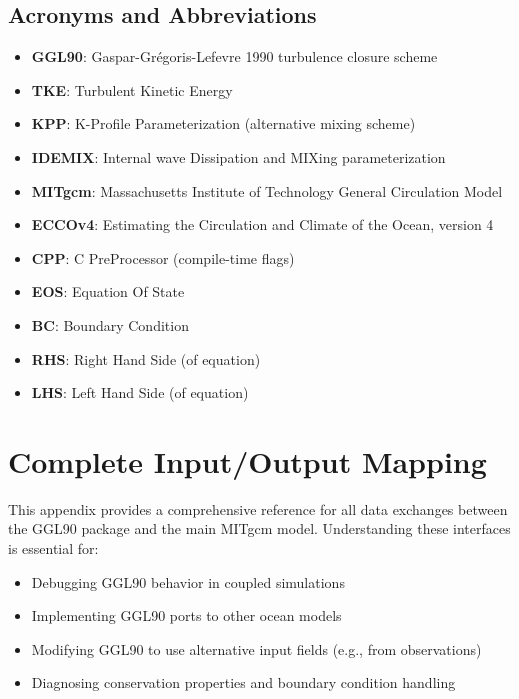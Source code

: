\documentclass[12pt,letterpaper]{article}
\begin{document}
\subsection*{Acronyms and Abbreviations}

\begin{itemize}
\item \textbf{GGL90}: Gaspar-Grégoris-Lefevre 1990 turbulence closure scheme
\item \textbf{TKE}: Turbulent Kinetic Energy
\item \textbf{KPP}: K-Profile Parameterization (alternative mixing scheme)
\item \textbf{IDEMIX}: Internal wave Dissipation and MIXing parameterization
\item \textbf{MITgcm}: Massachusetts Institute of Technology General Circulation Model
\item \textbf{ECCOv4}: Estimating the Circulation and Climate of the Ocean, version 4
\item \textbf{CPP}: C PreProcessor (compile-time flags)
\item \textbf{EOS}: Equation Of State
\item \textbf{BC}: Boundary Condition
\item \textbf{RHS}: Right Hand Side (of equation)
\item \textbf{LHS}: Left Hand Side (of equation)
\end{itemize}

\appendix

\section{Complete Input/Output Mapping}
\label{app:io_mapping}

This appendix provides a comprehensive reference for all data exchanges between the GGL90 package and the main MITgcm model. Understanding these interfaces is essential for:
\begin{itemize}
\item Debugging GGL90 behavior in coupled simulations
\item Implementing GGL90 ports to other ocean models
\item Modifying GGL90 to use alternative input fields (e.g., from observations)
\item Diagnosing conservation properties and boundary condition handling
\end{itemize}
\end{document}

